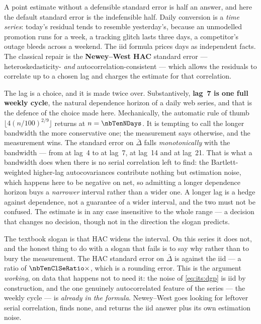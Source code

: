 A point estimate without a defensible standard error is half an answer, and here the default
standard error is the indefensible half. Daily conversion is a \emph{time series}: today's residual
tends to resemble yesterday's, because an unmodelled promotion runs for a week, a tracking glitch
lasts three days, a competitor's outage bleeds across a weekend. The iid formula prices
\nbTenNDays{} days as \nbTenNDays{} independent facts. The classical repair is the
\textbf{Newey--West HAC} standard error \citep{newey1987} --- heteroskedasticity- \emph{and}
autocorrelation-consistent --- which allows the residuals to correlate up to a chosen lag and
charges the estimate for that correlation.

The lag is a choice, and it is made twice over. Substantively, \textbf{lag~7 is one full weekly
cycle}, the natural dependence horizon of a daily web series, and that is the defence of the choice
made here. Mechanically, the automatic rule of thumb $\lfloor 4(n/100)^{2/9} \rfloor$
\citep{newey1994} returns \nbTenHacLagRule{} at $n = \nbTenNDays$. It is tempting to call the
longer bandwidth the more conservative one; the measurement says otherwise, and the measurement
wins. The standard error on $\bar\Delta$ falls \emph{monotonically} with the bandwidth --- from
\nbTenHacSeLagfour{} at lag~4 to \nbTenHacSeLagseven{} at lag~7, \nbTenHacSeLagfourteen{} at
lag~14 and \nbTenHacSeLagtwentyone{} at lag~21. That is what a bandwidth does when there is no
serial correlation left to find: the Bartlett-weighted higher-lag autocovariances contribute
nothing but estimation noise, which happens here to be negative on net, so admitting a longer
dependence horizon buys a \emph{narrower} interval rather than a wider one. A longer lag is a
hedge against dependence, not a guarantee of a wider interval, and the two must not be confused.
The estimate is in any case insensitive to the whole range --- a decision that changes no
decision, though not in the direction the slogan predicts.

The textbook slogan is that HAC widens the interval. On this series it does not, and the honest
thing to do with a slogan that fails is to say why rather than to bury the measurement. The HAC
standard error on $\bar\Delta$ is \nbTenClSe{} against the iid \nbTenClSeIid{} --- a ratio of
$\nbTenClSeRatio\times$, which is a rounding error. This is the argument \emph{working}, on data
that happens not to need it: the noise of \cref{eq:its:dgp} is iid by construction, and the one
genuinely autocorrelated feature of the series --- the weekly cycle --- is \emph{already in the
formula}. Newey--West goes looking for leftover serial correlation, finds none, and returns the iid
answer plus its own estimation noise.

